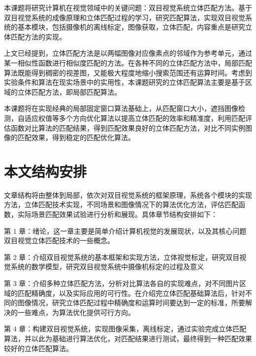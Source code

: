 本课题将研究计算机在视觉领域中的关键问题：双目视觉系统立体匹配方法。基于双目视觉系统的成像原理和立体匹配过程的学习，研究匹配算法，实现双目视觉系统的基本模块，包括摄像机的离线标定，图像获取，立体匹配，内容重点是研究立体匹配方法的实现。

上文已经提到，立体匹配方法是以两幅图像对应像素点的邻域作为参考单元，通过某一相似性函数进行相似度匹配的方法。在各种不同的立体匹配方法中，局部匹配算法既能得到稠密的视差图，又能极大程度地缩小搜索范围还有运算时间。考虑到实验条件和算法在现实场景中的实用性，本课题研究的立体匹配算法主要是基于区域的立体匹配方法，即局部匹配算法。

本课题将在实现经典的局部固定窗口算法基础上，从匹配窗口大小，遮挡图像检测，自适应权值等多个方向优化算法以提高立体匹配的效率和精准度，利用匹配评估函数对比算法的匹配结果，得到匹配效果良好的立体匹配方法，对比不同实例图像的匹配效果，得到稳定的匹配优化算法。

\section{本文结构安排}

文章结构将由整体到局部，依次对双目视觉系统的框架原理，系统各个模块的实现方法，立体匹配技术实现，不同场景和图像情况下的算法优化方法，评估匹配函数，实际场景匹配效果试验进行分析和展现。具体章节结构安排如下：

第 1 章：绪论，这一章主要是简单介绍计算机视觉的发展现状，以及其核心问题双目视觉立体匹配技术的一些概念。 

第 2 章：介绍双目视觉系统的基本框架和实现方法，立体视觉标定，研究双目视觉系统的数学模型，研究双目视觉系统中摄像机标定的过程及意义

第 3 章：介绍多种立体匹配方法，分析对比算法各自的实现难点，对不同图片区域的匹配精确度，以及实际应用的可行性。在介绍完立体匹配基础算法后，针对不同的图像情况，研究立体匹配过程中精确度和运算时间要达到一定的标准，所要解决的一些难点，为算法优化提供可行方向。

第 4 章：构建双目视觉系统，实现图像采集，离线标定，通过实验完成立体匹配算法，并以此为基础进行算法优化，对匹配结果进行测试，最终得到一种匹配效果较好的立体匹配算法。



